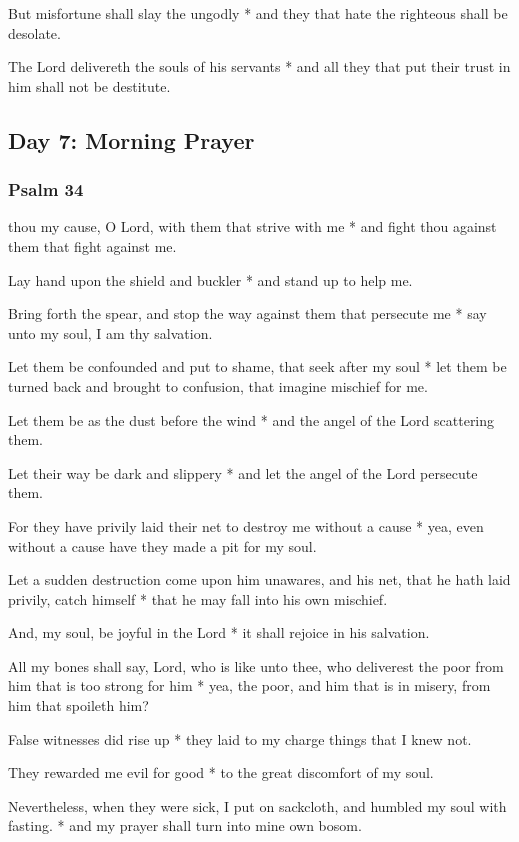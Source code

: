 But misfortune shall slay the ungodly * and they that hate the righteous shall be desolate.

The Lord delivereth the souls of his servants * and all they that put their trust in him shall not be destitute.

\subsection{Day 7: Morning Prayer}

\subsubsection{Psalm 34}


 thou my cause, O Lord, with them that strive with me * and fight thou against them that fight against me.

Lay hand upon the shield and buckler * and stand up to help me.

Bring forth the spear, and stop the way against them that persecute me * say unto my soul, I am thy salvation.

Let them be confounded and put to shame, that seek after my soul * let them be turned back and brought to confusion, that imagine mischief for me.

Let them be as the dust before the wind * and the angel of the Lord scattering them.

Let their way be dark and slippery * and let the angel of the Lord persecute them.

For they have privily laid their net to destroy me without a cause * yea, even without a cause have they made a pit for my soul.

Let a sudden destruction come upon him unawares, and his net, that he hath laid privily, catch himself * that he may fall into his own mischief.

And, my soul, be joyful in the Lord * it shall rejoice in his salvation.

All my bones shall say, Lord, who is like unto thee, who deliverest the poor from him that is too strong for him * yea, the poor, and him that is in misery, from him that spoileth him?

False witnesses did rise up * they laid to my charge things that I knew not.

They rewarded me evil for good * to the great discomfort of my soul.

Nevertheless, when they were sick, I put on sackcloth, and humbled my soul with fasting. * and my prayer shall turn into mine own bosom.

